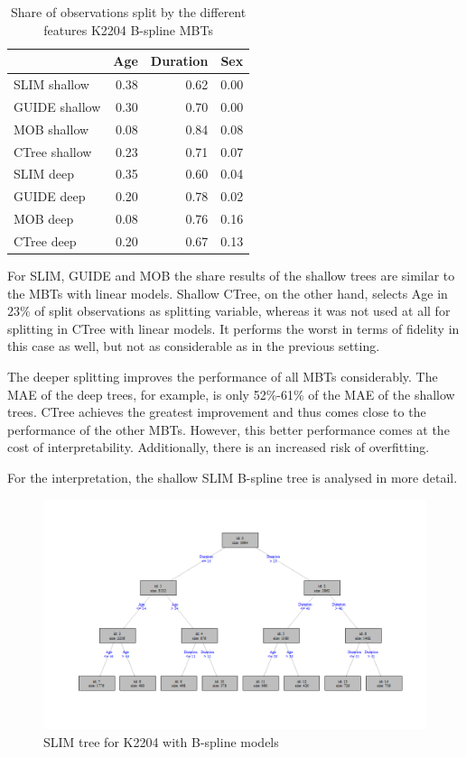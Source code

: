\begin{table}[!htb]
\caption{Share of observations split by the different features K2204 B-spline MBTs}
\centering
\begin{tabular}[t]{l|r|r|r}
\hline
  & Age & Duration & Sex\\
\hline
SLIM shallow & 0.38 & 0.62 & 0.00\\
GUIDE shallow & 0.30 & 0.70 & 0.00\\
MOB shallow & 0.08 & 0.84 & 0.08\\
CTree shallow & 0.23 & 0.71 & 0.07\\
\hline
SLIM deep & 0.35 & 0.60 & 0.04\\
GUIDE deep & 0.20 & 0.78 & 0.02\\
MOB deep & 0.08 & 0.76 & 0.16\\
CTree deep & 0.20 & 0.67 & 0.13\\
\hline
\end{tabular}
\label{tab:ins_k2204_bsplines_surrogates_share}
\end{table}

For SLIM, GUIDE and MOB the share results of the shallow trees are similar to the MBTs with linear models. Shallow CTree, on the other hand, selects Age in $23\%$ of split observations as splitting variable, whereas it was not used at all for splitting in CTree with linear models. It performs the worst in terms of fidelity in this case as well, but not as considerable as in the previous setting.

The deeper splitting improves the performance of all MBTs considerably. The MAE of the deep trees, for example, is only 52\%-61\% of the MAE of the shallow trees. CTree achieves the greatest improvement and thus comes close to the performance of the other MBTs. However, this better performance comes at the cost of interpretability. Additionally, there is an increased risk of overfitting.



For the interpretation, the shallow SLIM B-spline tree is analysed in more detail.

\begin{figure}[!htb]
    \centering   
    \includegraphics[width = 16cm]{Figures/insurance_use_case/k2204_BPV/slim_bsplines_small_tree.png}
         \caption{SLIM tree for K2204 with B-spline models}
     \label{fig:ins_slim_bsplines_tree}
\end{figure}

